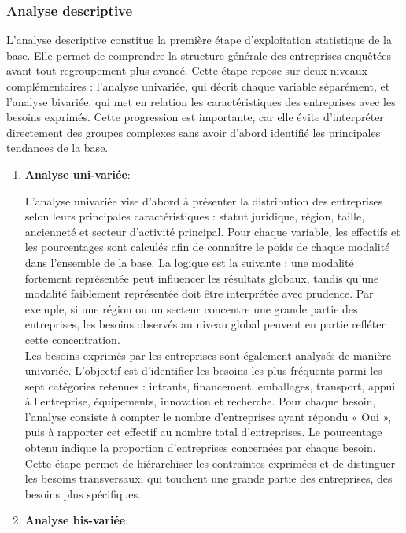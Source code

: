 \documentclass[12pt, a4paper, oneside]{report}
\begin{document}
	\subsubsection{Analyse descriptive}
	L’analyse descriptive constitue la première étape d’exploitation statistique de la base. Elle permet de comprendre la structure générale des entreprises enquêtées avant tout regroupement plus avancé. Cette étape repose sur deux niveaux complémentaires : l’analyse univariée, qui décrit chaque variable séparément, et l’analyse bivariée, qui met en relation les caractéristiques des entreprises avec les besoins exprimés. Cette progression est importante, car elle évite d’interpréter directement des groupes complexes sans avoir d’abord identifié les principales tendances de la base.
	\begin{enumerate}
		\item \textbf{Analyse uni-variée}:
		
		L’analyse univariée vise d’abord à présenter la distribution des entreprises selon leurs principales caractéristiques : statut juridique, région, taille, ancienneté et secteur d’activité principal. Pour chaque variable, les effectifs et les pourcentages sont calculés afin de connaître le poids de chaque modalité dans l’ensemble de la base. La logique est la suivante : une modalité fortement représentée peut influencer les résultats globaux, tandis qu’une modalité faiblement représentée doit être interprétée avec prudence. Par exemple, si une région ou un secteur concentre une grande partie des entreprises, les besoins observés au niveau global peuvent en partie refléter cette concentration.\\
		
		Les besoins exprimés par les entreprises sont également analysés de manière univariée. L’objectif est d’identifier les besoins les plus fréquents parmi les sept catégories retenues : intrants, financement, emballages, transport, appui à l’entreprise, équipements, innovation et recherche. Pour chaque besoin, l’analyse consiste à compter le nombre d’entreprises ayant répondu « Oui », puis à rapporter cet effectif au nombre total d’entreprises. Le pourcentage obtenu indique la proportion d’entreprises concernées par chaque besoin. Cette étape permet de hiérarchiser les contraintes exprimées et de distinguer les besoins transversaux, qui touchent une grande partie des entreprises, des besoins plus spécifiques.\\
		
		
	\item \textbf{Analyse bis-variée}:
	

\end{enumerate}
\end{document}
